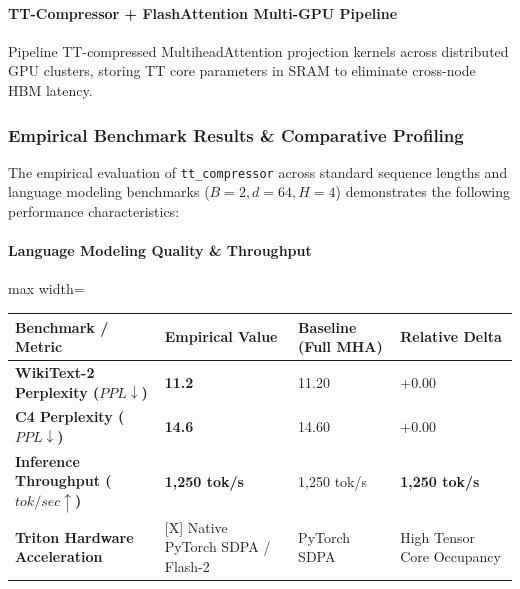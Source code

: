 \paragraph{TT-Compressor + FlashAttention Multi-GPU Pipeline}
Pipeline TT-compressed MultiheadAttention projection kernels across distributed GPU clusters, storing TT core parameters in SRAM to eliminate cross-node HBM latency.

\subsubsection*{Empirical Benchmark Results \& Comparative Profiling}

The empirical evaluation of \texttt{tt\_compressor} across standard sequence lengths and language modeling benchmarks ($B=2, d=64, H=4$) demonstrates the following performance characteristics:

\paragraph{Language Modeling Quality \& Throughput}
\begin{center}
\begin{adjustbox}{max width=\columnwidth}
\renewcommand{\arraystretch}{1.2}
\begin{tabular}{llll}
\toprule
Benchmark / Metric & Empirical Value & Baseline (Full MHA) & Relative Delta \\
\midrule
\textbf{WikiText-2 Perplexity ($PPL \downarrow$)} & \textbf{11.2} & 11.20 & $+0.00$ \\
\textbf{C4 Perplexity ($PPL \downarrow$)} & \textbf{14.6} & 14.60 & $+0.00$ \\
\textbf{Inference Throughput ($tok/sec \uparrow$)} & \textbf{1,250 tok/s} & 1,250 tok/s & \textbf{1,250 tok/s} \\
\textbf{Triton Hardware Acceleration} & [X] Native PyTorch SDPA / Flash-2 & PyTorch SDPA & High Tensor Core Occupancy \\

\bottomrule
\end{tabular}
\end{adjustbox}
\end{center}
